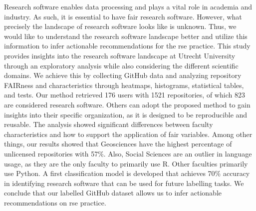 

Research software enables data processing and plays a vital role in academia and industry. As such, it is essential to have \acrfull{fair} research software. However, what precisely the landscape of research software looks like is unknown. Thus, we would like to understand the research software landscape better and utilize this information to infer actionable recommendations for the \acrfull{rse} practice.
This study provides insights into the research software landscape at Utrecht University through an exploratory analysis while also considering the different scientific domains. We achieve this by collecting GitHub data and analyzing repository FAIRness and characteristics through heatmaps, histograms, statistical tables, and tests. 
Our method retrieved 176 users with 1521 repositories, of which 823 are considered research software. Others can adopt the proposed method to gain insights into their specific organization, as it is designed to be reproducible and reusable.
The analysis showed significant differences between faculty characteristics and how to support the application of \acrshort{fair} variables. Among other things, our results showed that Geosciences have the highest percentage of unlicensed repositories with 57\%. Also, Social Sciences are an outlier in language usage, as they are the only faculty to primarily use R. Other faculties primarily use Python.
A first classification model is developed that achieves 70\% accuracy in identifying research software that can be used for future labelling tasks.
We conclude that our labelled GitHub dataset allows us to infer actionable recommendations on \acrshort{rse} practice.


